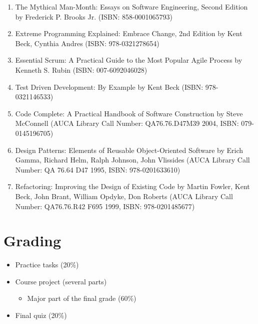 \documentclass[12pt,a4paper,oneside]{article}
\begin{document}
                \begin{enumerate}
                    \item The Mythical Man-Month: Essays on Software
                    Engineering, Second Edition by Frederick P. Brooks Jr.
                    (ISBN: 858-0001065793)
                    \item Extreme Programming Explained: Embrace Change, 2nd
                    Edition by Kent Beck, Cynthia Andres (ISBN: 978-0321278654)
                    \item Essential Scrum: A Practical Guide to the Most Popular
                    Agile Process by Kenneth S. Rubin (ISBN: 007-6092046028)
                    \item Test Driven Development: By Example by Kent Beck
                    (ISBN: 978-0321146533)
                    \item Code Complete: A Practical Handbook of Software
                    Construction by Steve McConnell (AUCA Library Call Number:
                    QA76.76.D47M39 2004, ISBN: 079-0145196705)
                    \item Design Patterns: Elements of Reusable Object-Oriented
                    Software by Erich Gamma, Richard Helm, Ralph Johnson, John
                    Vlissides (AUCA Library Call Number: QA 76.64 D47 1995,
                    ISBN: 978-0201633610)
                    \item Refactoring: Improving the Design of Existing Code by
                    Martin Fowler, Kent Beck, John Brant, William Opdyke, Don
                    Roberts (AUCA Library Call Number: QA76.76.R42 F695 1999,
                    ISBN: 978-0201485677)
                \end{enumerate}

    \section{Grading}

        \begin{itemize}
            \item Practice tasks (20\%)
            \item Course project (several parts)
            \begin{itemize}
                \item Major part of the final grade (60\%)
            \end{itemize}
            \item Final quiz (20\%)
        \end{itemize}
\end{document}
